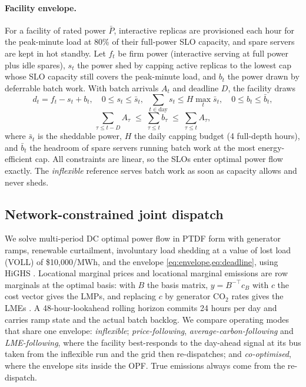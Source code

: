\documentclass{article} %
\begin{document}
\paragraph{Facility envelope.} For a facility of rated power $\bar P$, interactive replicas are provisioned each hour for the peak-minute load at 80\% of their full-power SLO capacity, and spare servers are kept in hot standby. Let $f_t$ be firm power (interactive serving at full power plus idle spares), $s_t$ the power shed by capping active replicas to the lowest cap whose SLO capacity still covers the peak-minute load, and $b_t$ the power drawn by deferrable batch work. With batch arrivals $A_t$ and deadline $D$, the facility draws
\begin{equation}
    d_t = f_t - s_t + b_t, \quad 0 \le s_t \le \bar s_t,\ \ \sum_{t \in \text{day}} s_t \le H \max_t \bar s_t, \quad 0 \le b_t \le \bar b_t,
    \label{eq:envelope}
\end{equation}
\begin{equation}
    \sum_{\tau \le t - D} A_\tau \;\le\; \sum_{\tau \le t} b_\tau \;\le\; \sum_{\tau \le t} A_\tau ,
    \label{eq:deadline}
\end{equation}
where $\bar s_t$ is the sheddable power, $H$ the daily capping budget (4 full-depth hours), and $\bar b_t$ the headroom of spare servers running batch work at the most energy-efficient cap. All constraints are linear, so the SLOs enter optimal power flow exactly. The \emph{inflexible} reference serves batch work as soon as capacity allows and never sheds.

\subsection{Network-constrained joint dispatch}
\label{sec:dispatch}
We solve multi-period DC optimal power flow in PTDF form with generator ramps, renewable curtailment, involuntary load shedding at a value of lost load (VOLL) of \$10{,}000/MWh, and the envelope \cref{eq:envelope,eq:deadline}, using HiGHS \citep{huangfu2018highs}. Locational marginal prices and locational marginal emissions are row marginals at the optimal basis: with $B$ the basis matrix, $y = B^{-\top} c_B$ with $c$ the cost vector gives the LMPs, and replacing $c$ by generator CO$_2$ rates gives the LMEs \citep{ruiz2010marginal}. A 48-hour-lookahead rolling horizon commits 24 hours per day and carries ramp state and the actual batch backlog. We compare operating modes that share one envelope: \emph{inflexible}; \emph{price-following}, \emph{average-carbon-following} and \emph{LME-following}, where the facility best-responds to the day-ahead signal at its bus taken from the inflexible run and the grid then re-dispatches; and \emph{co-optimised}, where the envelope sits inside the OPF. True emissions always come from the re-dispatch.
\end{document}
